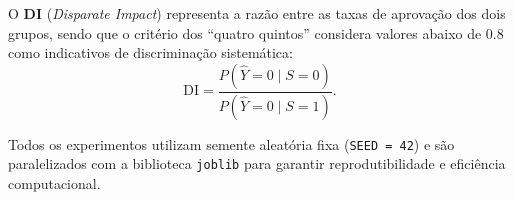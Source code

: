 O \textbf{DI} (\textit{Disparate Impact}) representa a razão entre as taxas de aprovação dos dois grupos, sendo que o critério dos ``quatro quintos'' considera valores abaixo de 0.8 como indicativos de discriminação sistemática:
\[
\text{DI} = \frac{P(\hat{Y} = 0 \mid S = 0)}{P(\hat{Y} = 0 \mid S = 1)}.
\]

Todos os experimentos utilizam semente aleatória fixa (\texttt{SEED = 42}) e são paralelizados com a biblioteca \texttt{joblib} para garantir reprodutibilidade e eficiência computacional.